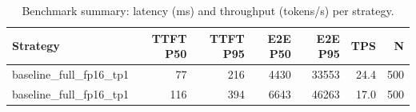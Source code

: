 \begin{table}
\caption{Benchmark summary: latency (ms) and throughput (tokens/s) per strategy.}
\label{tab:summary}
\begin{tabular}{lrrrrrr}
\toprule
Strategy & TTFT P50 & TTFT P95 & E2E P50 & E2E P95 & TPS & N \\
\midrule
baseline_full_fp16_tp1 & 77 & 216 & 4430 & 33553 & 24.4 & 500 \\
baseline_full_fp16_tp1 & 116 & 394 & 6643 & 46263 & 17.0 & 500 \\
\bottomrule
\end{tabular}
\end{table}
